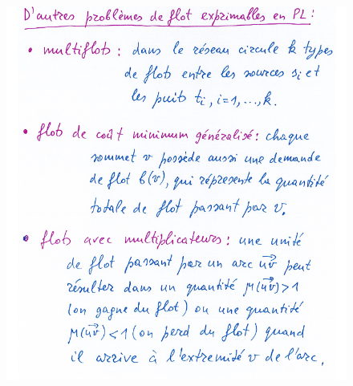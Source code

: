 \begin{figure}[!ht]
	\includegraphics[width=\linewidth,height=0.75\textheight]{notes/algorithme/pb_exp_pl.png}
\end{figure}
